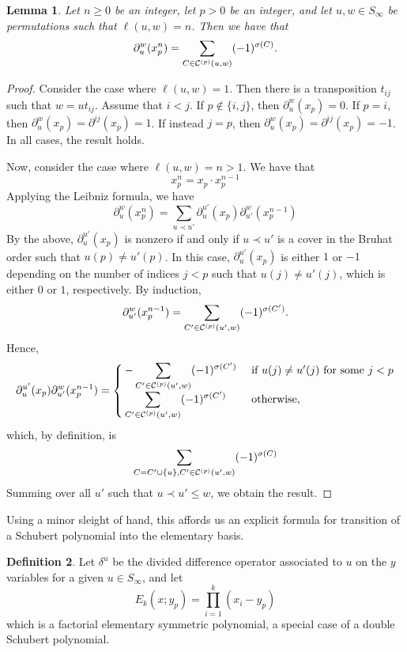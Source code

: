 \documentclass{amsart}
\newtheorem{lemma}{Lemma}[subsection]
\theoremstyle{definition}
\newtheorem{definition}[lemma]{Definition}
\theoremstyle{remark}
\numberwithin{equation}{subsection}
\begin{document}
\begin{lemma} \label{lemma:powerdiff}
Let $n\geq 0$ be an integer, let $p>0$ be an integer, and let $u, w\in S_\infty$ be permutations such that $\ell(u,w)=n$. Then we have that 
$$\partial_u^w(x_p^n) = \sum_{C\in \mathcal{C}^{(p)}(u,w)} (-1)^{\sigma(C)}.$$
\end{lemma}
\begin{proof}

  

Consider the case where $\ell(u,w)=1$. Then there is a transposition $t_{ij}$ such that $w = ut_{ij}$. Assume that $i<j$. If $p\notin\{i,j\}$, then $\partial_u^w(x_p)=0$. If $p=i$, then $\partial_u^w(x_p) = \partial^{ij}(x_p) = 1$. If instead $j=p$, then $\partial_u^w(x_p) = \partial^{ij}(x_p) = -1$. In all cases, the result holds.

Now, consider the case where $\ell(u,w)=n>1$. We have that
$$x_p^n = x_p\cdot x_p^{n-1}$$
Applying the Leibniz formula, we have
$$\partial_u^w(x_p^n) = \sum_{u\prec u'}\partial_u^{u'}(x_p)\partial_{u'}^w(x_p^{n-1})$$
By the above, $\partial_u^{u'}(x_p)$ is nonzero if and only if $u\prec u'$ is a cover in the Bruhat order such that $u(p)\neq u'(p)$. In this case, $\partial_u^{u'}(x_p)$ is either $1$ or $-1$ depending on the number of indices $j<p$ such that $u(j)\neq u'(j)$, which is either $0$ or $1$, respectively. By induction, 
$$\partial_{u'}^w(x_p^{n-1}) = \sum_{C'\in \mathcal{C}^{(p)}(u',w)} (-1)^{\sigma(C')}.$$
Hence, 
$$\partial_u^{u'}(x_p)\partial_{u'}^w(x_p^{n-1})=\begin{cases}
-\displaystyle\sum_{C'\in \mathcal{C}^{(p)}(u',w)} (-1)^{\sigma(C')}&\mbox{ if }u(j)\neq u'(j)\mbox{ for some }j<p\\
\displaystyle\sum_{C'\in \mathcal{C}^{(p)}(u',w)} (-1)^{\sigma(C')}&\mbox{ otherwise,}
\end{cases}$$
which, by definition, is
$$\sum_{C=C'\cup\{u\}, C'\in \mathcal{C}^{(p)}(u',w)} (-1)^{\sigma(C)}$$
Summing over all $u'$ such that $u\prec u'\leq w$, we obtain the result.
\end{proof}
Using a minor sleight of hand, this affords us an explicit formula for transition of a Schubert polynomial into the elementary basis.

\begin{definition}
Let $\delta^u$ be the divided difference operator associated to $u$ on the $y$ variables for a given $u\in S_\infty$, and let 
$$E_k(x;y_p)=\prod_{i=1}^k (x_i - y_p)$$
which is a factorial elementary symmetric polynomial, a special case of a double Schubert polynomial.
\end{definition}
\end{document}
